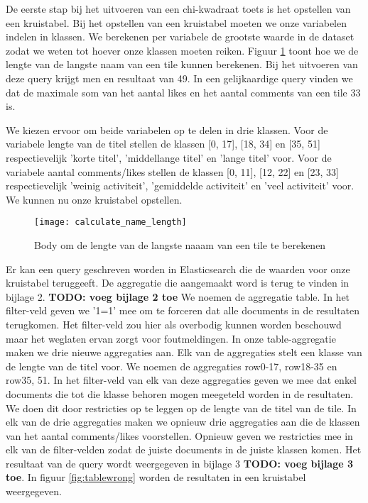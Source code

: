 De eerste stap bij het uitvoeren van een chi-kwadraat toets is het opstellen van een kruistabel. Bij het opstellen van een kruistabel moeten we onze variabelen indelen in klassen. We berekenen per variabele de grootste waarde in de dataset zodat we weten tot hoever onze klassen moeten reiken. Figuur \ref{fig:calculatenamelength} toont hoe we de lengte van de langste naam van een tile kunnen berekenen. Bij het uitvoeren van deze query krijgt men en resultaat van 49. In een gelijkaardige query vinden we dat de maximale som van het aantal likes en het aantal comments van een tile 33 is.

We kiezen ervoor om beide variabelen op te delen in drie klassen. Voor de variabele lengte van de titel stellen de klassen [0, 17], [18, 34] en [35, 51] respectievelijk 'korte titel', 'middellange titel' en 'lange titel' voor. Voor de variabele aantal comments/likes stellen de klassen [0, 11], [12, 22] en [23, 33] respectievelijk 'weinig activiteit', 'gemiddelde activiteit' en 'veel activiteit' voor. We kunnen nu onze kruistabel opstellen.

\begin{figure}
	\centering
	\texttt{[image: calculate\_name\_length]}
	\caption{Body om de lengte van de langste naaam van een tile te berekenen}
	\label{fig:calculatenamelength}
\end{figure}

Er kan een query geschreven worden in Elasticsearch die de waarden voor onze kruistabel teruggeeft. De aggregatie die aangemaakt word is terug te vinden in bijlage 2. \textbf{TODO: voeg bijlage 2 toe} We noemen de aggregatie table. In het filter-veld geven we '1=1' mee om te forceren dat alle documents in de resultaten terugkomen. Het filter-veld zou hier als overbodig kunnen worden beschouwd maar het weglaten ervan zorgt voor foutmeldingen. In onze table-aggregatie maken we drie nieuwe aggregaties aan. Elk van de aggregaties stelt een klasse van de lengte van de titel voor. We noemen de aggregaties row0-17, row18-35 en row35, 51. In het filter-veld van elk van deze aggregaties geven we mee dat enkel documents die tot die klasse behoren mogen meegeteld worden in de resultaten. We doen dit door restricties op te leggen op de lengte van de titel van de tile. In elk van de drie aggregaties maken we opnieuw drie aggregaties aan die de klassen van het aantal comments/likes voorstellen. Opnieuw geven we restricties mee in elk van de filter-velden zodat de juiste documents in de juiste klassen komen. Het resultaat van de query wordt weergegeven in bijlage 3 \textbf{TODO: voeg bijlage 3 toe}. In figuur \ref{fig:tablewrong} worden de resultaten in een kruistabel weergegeven.


